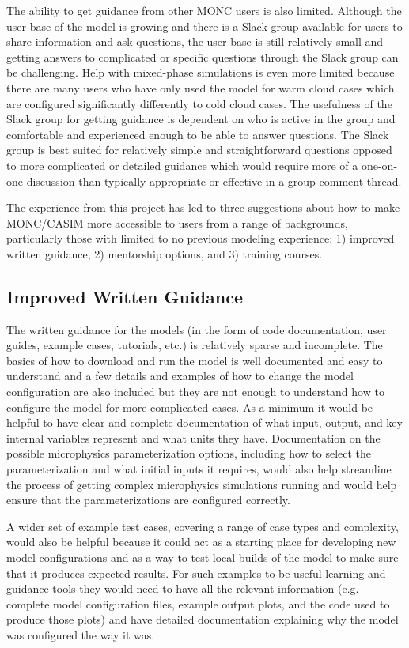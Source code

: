 The ability to get guidance from other MONC users is also limited. Although the user base of the model is growing and there is a Slack group available for users to share information and ask questions, the user base is still relatively small and getting answers to complicated or specific questions through the Slack group can be challenging. Help with mixed-phase simulations is even more limited because there are many users who have only used the model for warm cloud cases which are configured significantly differently to cold cloud cases. The usefulness of the Slack group for getting guidance is dependent on who is active in the group and comfortable and experienced enough to be able to answer questions. The Slack group is best suited for relatively simple and straightforward questions opposed to more complicated or detailed guidance which would require more of a one-on-one discussion than typically appropriate or effective in a group comment thread.

The experience from this project has led to three suggestions about how to make MONC/CASIM more accessible to users from a range of backgrounds, particularly those with limited to no previous modeling experience: 1) improved written guidance, 2) mentorship options, and 3) training courses.

\subsection{Improved Written Guidance}
The written guidance for the models (in the form of code documentation, user guides, example cases, tutorials, etc.) is relatively sparse and incomplete. The basics of how to download and run the model is well documented and easy to understand and a few details and examples of how to change the model configuration are also included but they are not enough to understand how to configure the model for more complicated cases. As a minimum it would be helpful to have clear and complete documentation of what input, output, and key internal variables represent and what units they have. Documentation on the possible microphysics parameterization options, including how to select the parameterization and what initial inputs it requires, would also help streamline the process of getting complex microphysics simulations running and would help ensure that the parameterizations are configured correctly.

A wider set of example test cases, covering a range of case types and complexity, would also be helpful because it could act as a starting place for developing new model configurations and as a way to test local builds of the model to make sure that it produces expected results. For such examples to be useful learning and guidance tools they would need to have all the relevant information (e.g. complete model configuration files, example output plots, and the code used to produce those plots) and have detailed documentation explaining why the model was configured the way it was.

